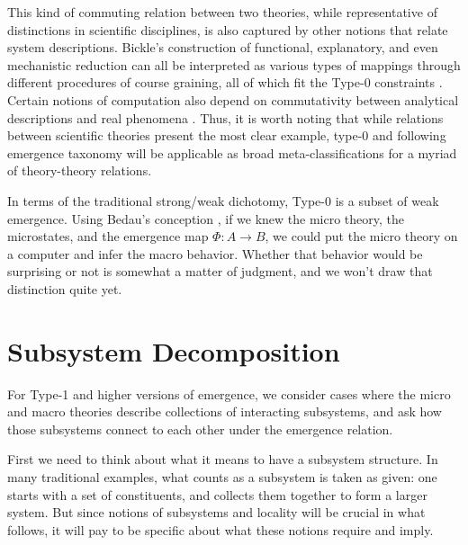 \documentclass[12pt,english]{article}
\newcommand{\autocite}{\cite}
\begin{document}
This kind of commuting relation between two theories, while representative of distinctions in scientific disciplines, is also captured by other notions that relate system descriptions. 
Bickle's construction of functional, explanatory, and even mechanistic reduction can all be interpreted as various types of mappings through different procedures of course graining, all of which fit the Type-0 constraints \autocite{Bickle2024}.
Certain notions of computation also depend on commutativity between analytical descriptions and real phenomena \autocite{Horsman2014}. Thus, it is worth noting that while relations between scientific theories present the most clear example, type-0 and following emergence taxonomy will be applicable as broad meta-classifications for a myriad of theory-theory relations.  

In terms of the traditional strong/weak dichotomy, Type-0 is a subset of weak emergence.
Using Bedau's conception \autocite{Bedau1997-BEDWE}, if we knew the micro theory, the microstates, and the emergence map $\Phi: A\rightarrow B$, we could put the micro theory on a computer and infer the macro behavior.
Whether that behavior would be surprising or not is somewhat a matter of judgment, and we won't draw that distinction quite yet.

\section*{Subsystem Decomposition}

For Type-1 and higher versions of emergence, we consider cases where the micro and macro theories describe collections of interacting subsystems, and ask how those subsystems connect to each other under the emergence relation.

First we need to think about what it means to have a subsystem structure.
In many traditional examples, what counts as a subsystem is taken as given: one starts with a set of constituents, and collects them together to form a larger system.
But since notions of subsystems and locality will be crucial in what follows, it will pay to be specific about what these notions require and imply.
\end{document}
